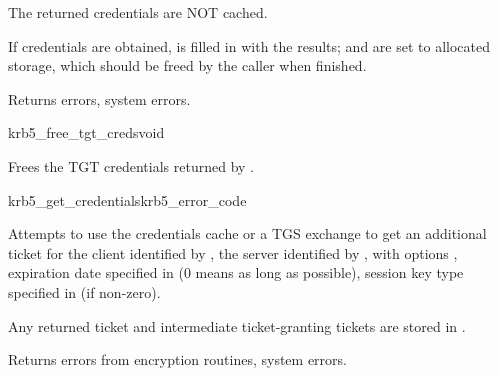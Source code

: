 The returned credentials are NOT cached.

If credentials are obtained,  is filled in with the results;
 and
 are set to allocated storage,
which should be freed by the caller when finished.

Returns errors, system errors.


\begin{funcdecl}{krb5_free_tgt_creds}{void}{\funcin}
\end{funcdecl}

Frees the TGT credentials  returned by
.

\begin{funcdecl}{krb5_get_credentials}{krb5_error_code}{\funcin}
\funcinout
{}
\end{funcdecl}

Attempts to use the credentials cache  or a TGS
exchange to get an additional ticket for the client identified by
, the server identified by
, with options ,
expiration date specified in  (0
means as long as possible), session key type specified in
 (if non-zero).

Any returned ticket and intermediate ticket-granting tickets are
stored in .

Returns errors from encryption routines, system errors.



